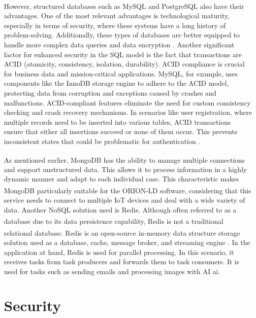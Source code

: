 However, structured databases such as MySQL\textsuperscript{\textregistered} and PostgreSQL\textsuperscript{\textregistered} also have their advantages. One of the most relevant advantages is technological maturity, especially in terms of security, where these systems have a long history of problem-solving. Additionally, these types of databases are better equipped to handle more complex data queries and data encryption \cite{nance2013nosql}. Another significant factor for enhanced security in the SQL model is the fact that transactions are ACID (atomicity, consistency, isolation, durability). ACID compliance is crucial for business data and mission-critical applications. MySQL, for example, uses components like the InnoDB storage engine to adhere to the ACID model, protecting data from corruption and exceptions caused by crashes and malfunctions. ACID-compliant features eliminate the need for custom consistency checking and crash recovery mechanisms. In scenarios like user registration, where multiple records need to be inserted into various tables, ACID transactions ensure that either all insertions succeed or none of them occur. This prevents inconsistent states that could be problematic for authentication \cite{mohamed2014relational}.

As mentioned earlier, MongoDB\textsuperscript{\textregistered} has the ability to manage multiple connections and support unstructured data. This allows it to process information in a highly dynamic manner and adapt to each individual case. This characteristic makes MongoDB\textsuperscript{\textregistered} particularly suitable for the ORION-LD\textsuperscript{\textregistered} software, considering that this service needs to connect to multiple IoT devices and deal with a wide variety of data. Another NoSQL solution used is Redis. Although often referred to as a database due to its data persistence capability, Redis\textsuperscript{\textregistered} is not a traditional relational database. Redis\textsuperscript{\textregistered} is an open-source in-memory data structure storage solution used as a database, cache, message broker, and streaming engine \cite{redis_redis_2023}. In the application at hand, Redis is used for parallel processing. In this scenario, it receives tasks from task producers and forwards them to task consumers. It is used for tasks such as sending emails and processing images with AI \acrshort{ai}.


\section{Security}\label{section:security}


